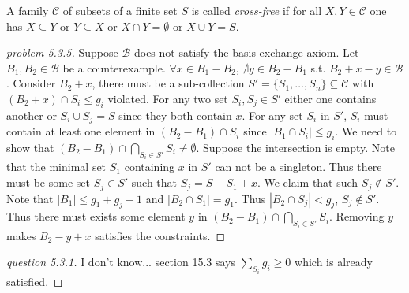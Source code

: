 \begin{definition}
    A family $\mathcal C$ of subsets of a finite set $S$ is called \emph{cross-free} if for all $X, Y \in \mathcal{C}$ one has $X\subseteq Y$ or $Y\subseteq X$ or $X\cap Y=\emptyset$ or $X\cup Y=S$.
\end{definition}
\begin{proof}[problem 5.3.5]
    Suppose $\mathcal{B}$ does not satisfy the basis exchange axiom.
    Let $B_1,B_2\in \mathcal B$ be a counterexample. $\forall x\in B_1-B_2$, $\nexists y\in B_2-B_1$ s.t. $B_2+x-y\in\mathcal B$. Consider $B_2+x$, there must be a sub-collection $S'=\{S_1,\ldots,S_n\}\subseteq \mathcal{C}$ with $(B_2+x)\cap S_i\leq g_i$ violated. For any two set $S_i,S_j\in S'$ either one contains another or $S_i\cup S_j=S$ since they both contain $x$.
    For any set $S_i$ in $S'$, $S_i$ must contain at least one element in $(B_2-B_1)\cap S_i$ since $|B_1\cap S_i|\leq g_i$. We need to show that $(B_2-B_1)\cap \bigcap_{S_i\in S'} S_i\not=\emptyset$. Suppose the intersection is empty. Note that the minimal set $S_1$ containing $x$ in $S'$ can not be a singleton. Thus there must be some set $S_j\in S'$ such that $S_j=S-S_1+x$. We claim that such $S_j\notin S'$. Note that $|B_1|\leq g_1+g_j-1$ and $|B_2\cap S_1|=g_1$. Thus $|B_2\cap S_j|<g_j$, $S_j\notin S'$. Thus there must exists some element $y$ in $(B_2-B_1)\cap \bigcap_{S_i\in S'} S_i$. Removing $y$ makes $B_2-y+x$ satisfies the constraints.
\end{proof}
\begin{proof}[question 5.3.1]
    I don't know... section 15.3 says $\sum_{S_i} g_i\geq 0$ which is already satisfied.
\end{proof}
